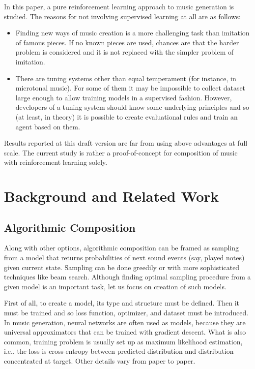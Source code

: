 \documentclass{article}
\begin{document}
In this paper, a pure reinforcement learning approach to music generation is studied. The reasons for not involving supervised learning at all are as follows:
\begin{itemize}
	\item Finding new ways of music creation is a more challenging task than imitation of famous pieces. If no known pieces are used, chances are that the harder problem is considered and it is not replaced with the simpler problem of imitation.
	\item There are tuning systems other than equal temperament (for instance, in microtonal music). For some of them it may be impossible to collect dataset large enough to allow training models in a supervised fashion. However, developers of a tuning system should know some underlying principles and so (at least, in theory) it is possible to create evaluational rules and train an agent based on them.
\end{itemize}

Results reported at this draft version are far from using above advantages at full scale. The current study is rather a proof-of-concept for composition of music with reinforcement learning solely.


\section{Background and Related Work}
\label{sec:literature}

\subsection{Algorithmic Composition}
\label{subsec:composition}

Along with other options, algorithmic composition can be framed as sampling from a model that returns probabilities of next sound events (say, played notes) given current state. Sampling can be done greedily or with more sophisticated techniques like beam search. Although finding optimal sampling procedure from a given model is an important task, let us focus on creation of such models.

First of all, to create a model, its type and structure must be defined. Then it must be trained and so loss function, optimizer, and dataset must be introduced. In music generation, neural networks are often used as models, because they are universal approximators that can be trained with gradient descent. What is also common, training problem is usually set up as maximum likelihood estimation, i.e., the loss is cross-entropy between predicted distribution and distribution concentrated at target. Other details vary from paper to paper.
\end{document}
